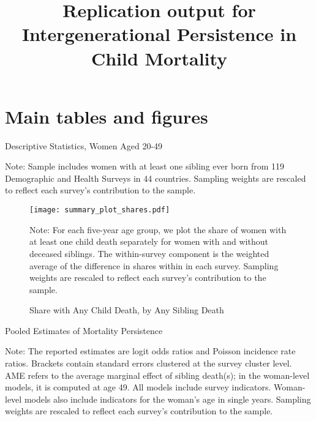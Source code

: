 \documentclass[12pt,english]{article}
\begin{document}
\title{Replication output for Intergenerational Persistence in Child Mortality}
\maketitle

\pagebreak
\setcounter{page}{1}

\FloatBarrier
\section{Main tables and figures}

\begin{table}
\begin{center}
\caption{Descriptive Statistics, Women Aged 20-49}
\label{table:sumstats}

\end{center}
\footnotesize{Note: Sample includes women with at least one sibling ever born from 119 Demographic and Health Surveys in 44 countries. Sampling weights are rescaled to reflect each survey's contribution to the sample.} 
\end{table}

\begin{figure}[t]
    \caption{Share with Any Child Death, by Any Sibling Death}
    \label{figure:shares}
    \begin{center}
    \texttt{[image: summary\_plot\_shares.pdf]}
    \end{center}

\footnotesize{Note: For each five-year age group, we plot the share of women with at least one child death separately for women with and without deceased siblings. The within-survey component is the weighted average of the difference in shares within in each survey. Sampling weights are rescaled to reflect each survey's contribution to the sample.}
\end{figure}

\begin{table}[t]
\begin{center}
\caption{Pooled Estimates of Mortality Persistence}
\label{table:main}
\par
{}

\end{center}
\footnotesize{Note: The reported estimates are logit odds ratios and Poisson incidence rate ratios. Brackets contain standard errors clustered at the survey cluster level. AME refers to the average marginal effect of sibling death(s); in the woman-level models, it is computed at age 49. All models include survey indicators. Woman-level models also include indicators for the woman's age in single years. Sampling weights are rescaled to reflect each survey's contribution to the sample.}
\end{table}
\end{document}
